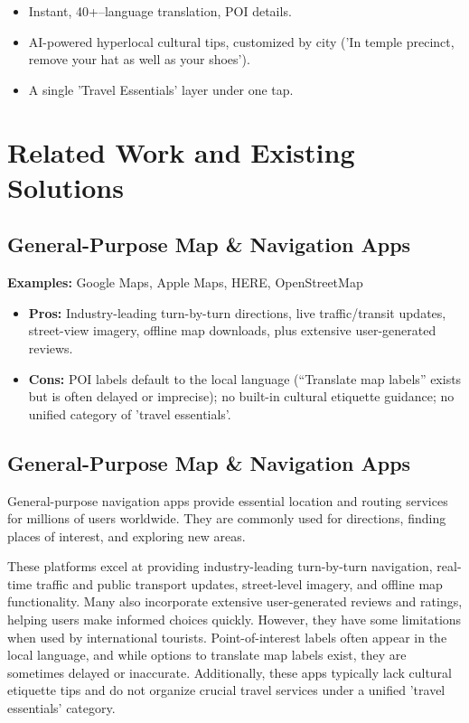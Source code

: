 \begin{itemize}
\item Instant, 40+--language translation, POI details.
\item AI-powered hyperlocal cultural tips, customized by city  ('In temple precinct, remove your hat as well as your shoes').
\item A single 'Travel Essentials' layer under one tap.
\end{itemize}

\section{Related Work and Existing Solutions}

\subsection{General-Purpose Map \& Navigation Apps}
\textbf{Examples:} Google Maps, Apple Maps, HERE, OpenStreetMap

\begin{itemize}
\item \textbf{Pros:} Industry-leading turn-by-turn directions, live traffic/transit updates, street-view imagery, offline map downloads, plus extensive user-generated reviews.
\item \textbf{Cons:} POI labels default to the local language (“Translate map labels” exists but is often delayed or imprecise); no built-in cultural etiquette guidance;  no unified category of 'travel essentials'.
\end{itemize}

\subsection{General-Purpose Map \& Navigation Apps}

General-purpose navigation apps provide essential location and routing services for millions of users worldwide. They are commonly used for directions, finding places of interest, and exploring new areas.

These platforms excel at providing industry-leading turn-by-turn navigation, real-time traffic and public transport updates, street-level imagery, and offline map functionality. Many also incorporate extensive user-generated reviews and ratings, helping users make informed choices quickly.
However, they have some limitations when used by international tourists. Point-of-interest labels often appear in the local language, and while options to translate map labels exist, they are sometimes delayed or inaccurate. Additionally, these apps typically lack cultural etiquette tips and do not organize crucial travel services under a unified 'travel essentials' category.

